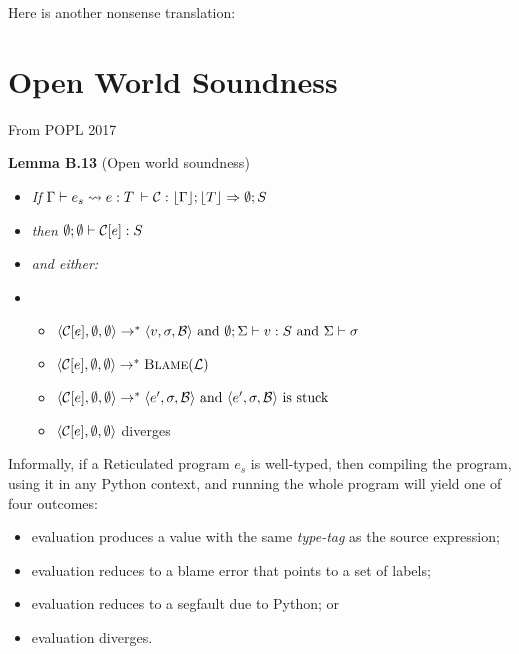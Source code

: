 \documentclass{article}
\begin{document}
Here is another nonsense translation:

\begin{mathpar}
\end{mathpar}




\section{Open World Soundness}


From POPL 2017

\textbf{Lemma B.13} (Open world soundness)
\begin{itemize}
\item[] \emph{If}
  \subitem $\Gamma \vdash e_s \compilesto e : T$
  \subitem $\vdash \context : \tagof{\Gamma} ; \tagof{T} \Rightarrow \emptyset; S$
\item[] \emph{then}
  \subitem $\emptyset; \emptyset \vdash \context[e] : S$
\item[] \emph{and either:}
\item[]
  \begin{itemize}
  \item $\config{\context[e], \emptyset, \emptyset} \stepsto \config{v, \sigma, \blameset}
         \mbox{ and }
         \emptyset; \Sigma \vdash v : S
         \mbox{ and }
         \Sigma \vdash \sigma$
  \item $\config{\context[e], \emptyset, \emptyset} \stepsto \blame{\labels}$
  \item $\config{\context[e], \emptyset, \emptyset} \stepsto \config{e', \sigma, \blameset}
         \mbox{ and }
         \config{e', \sigma, \blameset} \mbox{ is stuck}$
  \item $\config{\context[e], \emptyset, \emptyset}$ diverges
  \end{itemize}
\end{itemize}

Informally, if a Reticulated program $e_s$ is well-typed, then compiling the program,
 using it in any Python context, and running the whole program will yield one
 of four outcomes:
\begin{itemize}
\item evaluation produces a value with the same \emph{type-tag} as the source expression;
\item evaluation reduces to a blame error that points to a set of labels;
\item evaluation reduces to a segfault due to Python; or
\item evaluation diverges.
\end{itemize}
\end{document}
